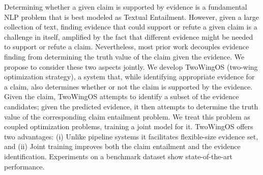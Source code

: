 Determining whether a given claim is supported by evidence is a fundamental NLP problem that is best modeled as Textual Entailment. However, given a large collection of text, finding evidence that could support or refute a given claim is a challenge in itself, amplified by the fact that different evidence might be needed to support or refute a claim. Nevertheless, most prior work decouples evidence finding from determining the truth value of the claim given the evidence. We propose to consider these two aspects jointly. We develop  TwoWingOS (two-wing  optimization strategy), a system that, while identifying appropriate evidence for a claim, also determines whether or not the claim is supported by the evidence. Given the claim, TwoWingOS attempts to identify a subset of the evidence candidates; given the predicted evidence, it then attempts to determine the truth value of the corresponding claim entailment problem. We treat this problem as coupled optimization problems, training a joint model for it. TwoWingOS offers two advantages: (i) Unlike pipeline systems it facilitates flexible-size evidence set, and (ii) Joint training  improves both the claim entailment and the evidence identification. Experiments on a  benchmark dataset show state-of-the-art performance.
